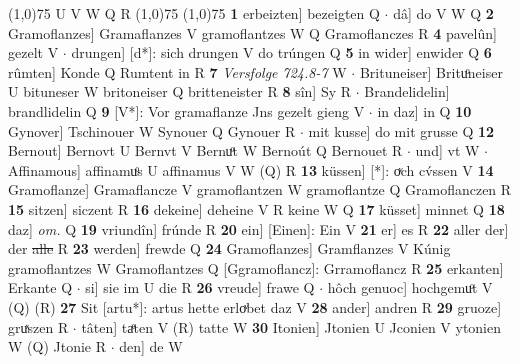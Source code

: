 \documentclass[8pt,a4paper,notitlepage]{article}
\begin{document}
\begin{table}[ht]
\begin{minipage}[t]{0.5\linewidth}
\scriptsize
\line(1,0){75} \newline
U V W Q R \newline
\line(1,0){75} \newline
\newline
\line(1,0){75} \newline
\textbf{1} erbeizten] bezeigten Q  $\cdot$ dâ] do V W Q \textbf{2} Gramoflanzes] Gramaflanzes V gramoflantzes W Q Gramoflanczes R \textbf{4} pavelûn] gezelt V  $\cdot$ drungen] [d*]: sich drungen V do trúngen Q \textbf{5} in wider] enwider Q \textbf{6} rûmten] Konde Q Rumtent in R \textbf{7} \textit{Versfolge 724.8-7} W   $\cdot$ Brituneiser] Brituͦneiser U bituneser W britoneiser Q britteneister R \textbf{8} sîn] Sy R  $\cdot$ Brandelidelin] brandlidelin Q \textbf{9} [V*]: Vor gramaflanze Jns gezelt gieng V  $\cdot$ in daz] in Q \textbf{10} Gynover] Tschinouer W Synouer Q Gynouer R  $\cdot$ mit kusse] do mit grusse Q \textbf{12} Bernout] Bernovt U Bernvt V Bernuͦt W Bernoút Q Bernouet R  $\cdot$ und] vt W  $\cdot$ Affinamous] affinamuͦs U affinamus V W (Q) R \textbf{13} küssen] [*]: oͮch cv́ssen V \textbf{14} Gramoflanze] Gramaflancze V gramoflantzen W gramoflantze Q Gramoflanczen R \textbf{15} sitzen] siczent R \textbf{16} dekeine] deheine V R keine W Q \textbf{17} küsset] minnet Q \textbf{18} daz] \textit{om.} Q \textbf{19} vriundîn] frúnde R \textbf{20} ein] [Einen]: Ein V \textbf{21} er] es R \textbf{22} aller der] der \sout{alle} R \textbf{23} werden] frewde Q \textbf{24} Gramoflanzes] Gramflanzes V Kúnig gramoflantzes W Gramoflantzes Q [Ggramoflancz]: Grramoflancz R \textbf{25} erkanten] Erkante Q  $\cdot$ si] sie im U die R \textbf{26} vreude] frawe Q  $\cdot$ hôch genuoc] hochgemuͦt V (Q) (R) \textbf{27} Sit [artu*]: artus hette erloͮbet daz V \textbf{28} ander] andren R \textbf{29} gruoze] gruͯszen R  $\cdot$ tâten] taͤten V (R) tatte W \textbf{30} Itonien] Jtonien U Jconien V ytonien W (Q) Jtonie R  $\cdot$ den] de W \newline
\end{minipage}
\end{table}
\end{document}

